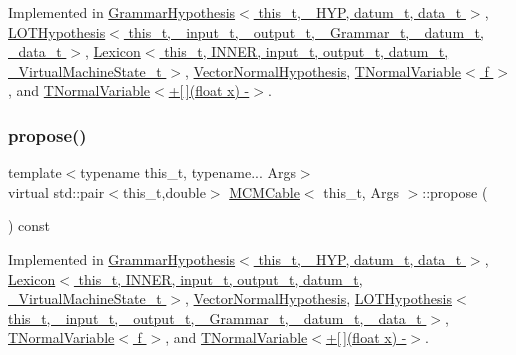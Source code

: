 Implemented in \hyperlink{class_grammar_hypothesis_a5af8ece466cdc1d0fc2a960ae1d63462}{Grammar\+Hypothesis$<$ this\+\_\+t, \+\_\+\+H\+Y\+P, datum\+\_\+t, data\+\_\+t $>$}, \hyperlink{class_l_o_t_hypothesis_a0b157edae49758c4159a196e8a458fa7}{L\+O\+T\+Hypothesis$<$ this\+\_\+t, \+\_\+input\+\_\+t, \+\_\+output\+\_\+t, \+\_\+\+Grammar\+\_\+t, \+\_\+datum\+\_\+t, \+\_\+data\+\_\+t $>$}, \hyperlink{class_lexicon_a04bde89f87b53ea3b283149f159dd35f}{Lexicon$<$ this\+\_\+t, I\+N\+N\+E\+R, input\+\_\+t, output\+\_\+t, datum\+\_\+t, \+\_\+\+Virtual\+Machine\+State\+\_\+t $>$}, \hyperlink{class_vector_normal_hypothesis_aabe2e0f4c86e52c04add65a55a046b6a}{Vector\+Normal\+Hypothesis}, \hyperlink{class_t_normal_variable_add62dd259e5d400ce6711f11e3e77455}{T\+Normal\+Variable$<$ f $>$}, and \hyperlink{class_t_normal_variable_add62dd259e5d400ce6711f11e3e77455}{T\+Normal\+Variable$<$+\mbox{[}$\,$\mbox{]}(float x) -\/$>$}.

\mbox{\label{class_m_c_m_cable_a98b52f1867ea0d72c1c91b4496d756d2}} 
\subsubsection{\texorpdfstring{propose()}{propose()}}
{\footnotesize\ttfamily template$<$typename this\+\_\+t, typename... Args$>$ \\
virtual std\+::pair$<$this\+\_\+t,double$>$ \hyperlink{class_m_c_m_cable}{M\+C\+M\+Cable}$<$ this\+\_\+t, Args $>$\+::propose (\begin{DoxyParamCaption}{ }\end{DoxyParamCaption}) const\hspace{0.3cm}{\ttfamily [pure virtual]}}



Implemented in \hyperlink{class_grammar_hypothesis_a8e6d781ab5fa0a6656b09b607a906735}{Grammar\+Hypothesis$<$ this\+\_\+t, \+\_\+\+H\+Y\+P, datum\+\_\+t, data\+\_\+t $>$}, \hyperlink{class_lexicon_a55ee8238cd46ef0ffcefe46ba9af47e2}{Lexicon$<$ this\+\_\+t, I\+N\+N\+E\+R, input\+\_\+t, output\+\_\+t, datum\+\_\+t, \+\_\+\+Virtual\+Machine\+State\+\_\+t $>$}, \hyperlink{class_vector_normal_hypothesis_afe56f3d3e501c5add4857ae8e5db4296}{Vector\+Normal\+Hypothesis}, \hyperlink{class_l_o_t_hypothesis_a0b1aac85e8c09fbdf438e6bf443951b7}{L\+O\+T\+Hypothesis$<$ this\+\_\+t, \+\_\+input\+\_\+t, \+\_\+output\+\_\+t, \+\_\+\+Grammar\+\_\+t, \+\_\+datum\+\_\+t, \+\_\+data\+\_\+t $>$}, \hyperlink{class_t_normal_variable_ad749023d34d2fad8b465aa2bfeba51a3}{T\+Normal\+Variable$<$ f $>$}, and \hyperlink{class_t_normal_variable_ad749023d34d2fad8b465aa2bfeba51a3}{T\+Normal\+Variable$<$+\mbox{[}$\,$\mbox{]}(float x) -\/$>$}.

